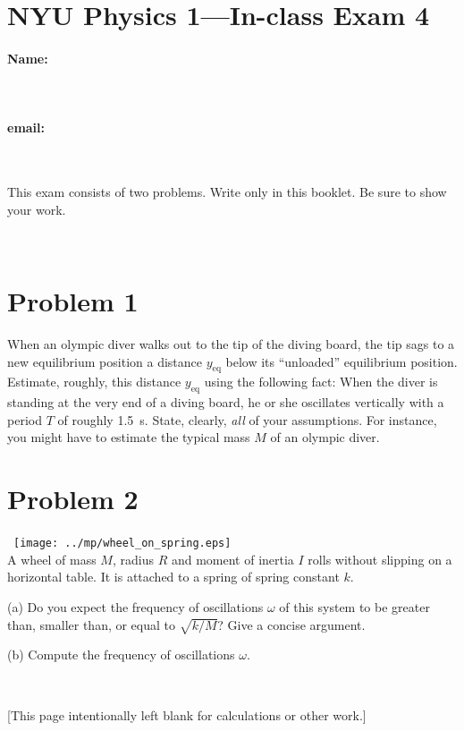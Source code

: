 \documentclass[12pt]{article}
\begin{document}
\section*{NYU Physics 1---In-class Exam 4}

\vfill

\paragraph{Name:} ~

\paragraph{email:} ~

\vfill

This exam consists of two problems.  Write only in this booklet.  Be
sure to show your work.

\vfill ~

\clearpage

\section*{Problem 1}

When an olympic diver walks out to the tip of the diving board, the
tip sags to a new equilibrium position a distance $y_\mathrm{eq}$
below its ``unloaded'' equilibrium position.  Estimate, roughly, this
distance $y_\mathrm{eq}$ using the following fact: When the diver is
standing at the very end of a diving board, he or she oscillates
vertically with a period $T$ of roughly 1.5~s.  State, clearly,
\emph{all} of your assumptions.  For instance, you might have to
estimate the typical mass $M$ of an olympic diver.

\clearpage

\section*{Problem 2}

\noindent~\hfill\texttt{[image: ../mp/wheel\_on\_spring.eps]}\hfill~\\
A wheel of mass $M$, radius $R$ and moment of inertia $I$ rolls
without slipping on a horizontal table.  It is attached to a spring of
spring constant $k$.

(a) Do you expect the frequency of oscillations $\omega$ of this
system to be greater than, smaller than, or equal to $\sqrt{k/M}$?
Give a concise argument.

\vfill

(b) Compute the frequency of oscillations $\omega$.

\vfill ~

\clearpage

[This page intentionally left blank for calculations or other work.]
\end{document}
